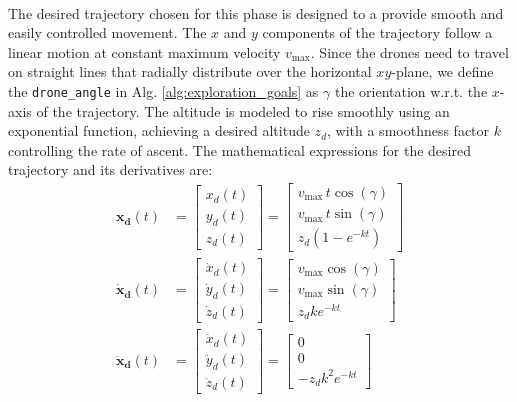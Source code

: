 \noindent\\
The desired trajectory chosen for this phase
is designed to a provide smooth and easily controlled movement. 
The \(x\) and \(y\) components of the trajectory follow 
a linear motion at constant maximum velocity \(v_{\text{max}}\). 
Since the drones need to travel on straight lines that 
radially distribute over the horizontal $xy$-plane, we 
define the \texttt{drone\_angle} in Alg. \ref{alg:exploration_goals} as
\(\gamma \) the orientation w.r.t. the $x$-axis of the trajectory.
The altitude is modeled to rise smoothly 
using an exponential function, achieving a desired altitude \(z_d\), 
with a smoothness factor \(k\) controlling the rate of ascent. 
The mathematical expressions for the desired trajectory and 
its derivatives are:
\begin{equation}
\begin{aligned}
\mathbf{x_d}(t) &= 
\begin{bmatrix}
x_d(t) \\ y_d(t) \\ z_d(t)
\end{bmatrix}
=
\begin{bmatrix}
v_{\text{max}} \, t \cos(\gamma) \\
v_{\text{max}} \, t \sin(\gamma) \\
z_d \left(1 - e^{-k t}\right)
\end{bmatrix} \\[10pt]
\mathbf{\dot{x}_d}(t) &= 
\begin{bmatrix}
\dot{x}_d(t) \\ \dot{y}_d(t) \\ \dot{z}_d(t)
\end{bmatrix}
=
\begin{bmatrix}
v_{\text{max}} \cos(\gamma) \\
v_{\text{max}} \sin(\gamma) \\
z_d k e^{-k t}
\end{bmatrix} \\[10pt]
\mathbf{\ddot{x}_d}(t) &= 
\begin{bmatrix}
\ddot{x}_d(t) \\ \ddot{y}_d(t) \\ \ddot{z}_d(t)
\end{bmatrix}
=
\begin{bmatrix}
0 \\
0 \\
-z_d k^2 e^{-k t}
\end{bmatrix}
\end{aligned}
\end{equation}
    
